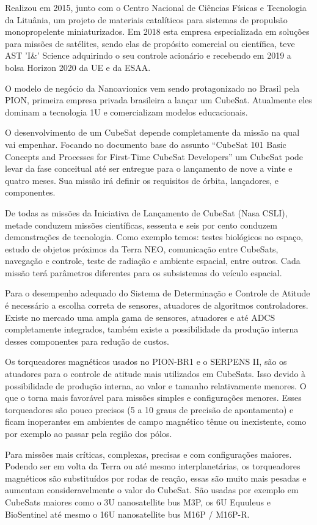Realizou em 2015, junto com o Centro Nacional de Ciências Físicas e Tecnologia da Lituânia, um projeto de materiais catalíticos para sistemas de propulsão monopropelente miniaturizados. Em 2018 esta empresa especializada em soluções para missões de satélites, sendo elas de propósito comercial ou científica, teve AST 'I\&' Science adquirindo o  seu controle acionário e recebendo em 2019 a bolsa Horizon 2020 da UE e da ESAA.

O modelo de negócio da Nanoavionics vem sendo protagonizado no Brasil pela PION, primeira empresa privada brasileira a lançar um CubeSat. Atualmente eles dominam a tecnologia 1U e comercializam modelos educacionais.

O desenvolvimento de um CubeSat depende completamente da missão na qual vai empenhar. Focando no documento base do assunto “CubeSat 101 Basic Concepts and Processes for First-Time CubeSat Developers” um CubeSat pode levar da fase conceitual até ser entregue para o lançamento de nove a vinte e quatro meses. Sua missão irá definir  os requisitos de órbita, lançadores, e componentes.

 De todas as missões da Iniciativa de Lançamento de CubeSat (Nasa CSLI), metade conduzem missões científicas, sessenta e seis por cento conduzem demonstrações de tecnologia. Como exemplo temos: testes biológicos no espaço, estudo de objetos próximos da Terra NEO, comunicação entre CubeSats, navegação e controle, teste de radiação e ambiente espacial, entre outros. Cada missão terá parâmetros diferentes para os subsistemas do veículo espacial.
 
Para o desempenho adequado do Sistema de Determinação e Controle de Atitude é necessário a escolha correta de sensores, atuadores de algoritmos controladores. Existe no mercado uma ampla gama de sensores, atuadores e até ADCS completamente integrados, também existe a possibilidade da produção interna desses componentes para redução de custos.

 Os torqueadores magnéticos usados no PION-BR1 e o SERPENS II, são os atuadores para o controle de atitude mais utilizados em CubeSats. Isso devido à possibilidade de produção interna, ao valor e tamanho relativamente menores. O que o torna mais favorável para missões simples e configurações menores. Esses torqueadores são pouco precisos (5 a 10 graus de precisão de apontamento) e ficam inoperantes em ambientes de campo magnético tênue ou inexistente, como por exemplo ao passar pela região dos pólos.
 
 Para missões mais críticas, complexas, precisas e com configurações maiores. Podendo ser em volta da Terra ou até mesmo interplanetárias, os torqueadores magnéticos são substituídos por rodas de reação, essas são muito mais pesadas e aumentam consideravelmente o valor do CubeSat. São usadas por exemplo em CubeSats maiores como o 3U nanosatellite bus M3P, os 6U Equuleus e BioSentinel até mesmo o 16U nanosatellite bus M16P / M16P-R.
 
